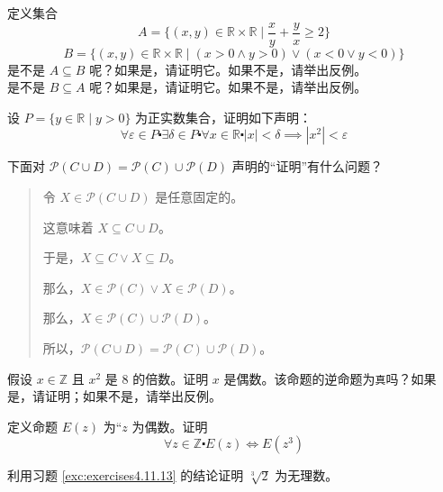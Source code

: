 \begin{exercise}
    定义集合
    \[A = \Big\{(x, y) \in \mathbb{R} \times \mathbb{R} \mid \frac{x}{y}+\frac{y}{x} \ge 2\Big\}\]
    \[B = \{(x, y) \in \mathbb{R} \times \mathbb{R} \mid (x>0 \land y>0) \lor (x<0 \lor y<0)\}\]
    是不是 $A \subseteq B$ 呢？如果是，请证明它。如果不是，请举出反例。\\
    是不是 $B \subseteq A$ 呢？如果是，请证明它。如果不是，请举出反例。
\end{exercise}

\begin{exercise}
    设 $P = \{y \in \mathbb{R} \mid y > 0\}$ 为正实数集合，证明如下声明：
    \[\forall \varepsilon \in P \centerdot \exists \delta \in P \centerdot \forall x \in \mathbb{R} \centerdot |x| < \delta \implies|x^2| < \varepsilon\]
\end{exercise}

\begin{exercise}
    下面对 $\mathcal{P}(C \cup D) = \mathcal{P}(C) \cup \mathcal{P}(D)$ 声明的``证明''有什么问题？
    \begin{quote}
        令 $X \in \mathcal{P}(C \cup D)$ 是任意固定的。

        这意味着 $X \subseteq C \cup D$。

        于是，$X \subseteq C \lor X \subseteq D$。

        那么，$X \in \mathcal{P}(C) \lor X \in \mathcal{P}(D)$。
        
        那么，$X \in \mathcal{P}(C) \cup \mathcal{P}(D)$。

        所以，$\mathcal{P}(C \cup D) = \mathcal{P}(C) \cup \mathcal{P}(D)$。
    \end{quote}
\end{exercise}

\begin{exercise}
    假设 $x \in \mathbb{Z}$ 且 $x^2$ 是 $8$ 的倍数。证明 $x$ 是偶数。该命题的逆命题为\verb|真|吗？如果是，请证明；如果不是，请举出反例。
\end{exercise}

\begin{exercise} \label{ex:exercises4.11.13}
    定义命题 $E(z)$ 为``$z$ 为偶数。证明
    \[\forall z \in \mathbb{Z} \centerdot E(z) \iff E(z^3)\]
\end{exercise}

\begin{exercise}
    利用习题 \ref{exc:exercises4.11.13} 的结论证明 $\sqrt[3]{2}$ 为无理数。
\end{exercise}

